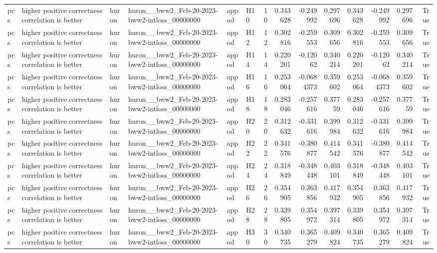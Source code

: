 \begin{longtable}{llllllrrrrrrrr}
pcs & higher positive correctness correlation is better & huron & huron\_\_bww2\_Feb-20-2023-bww2-intloss\_00000000 & appod & H10 & 10 & 0.343628 & -0.249992 & 0.297696 & 0.343628 & -0.249992 & 0.297696 & True \\
pcs & higher positive correctness correlation is better & huron & huron\_\_bww2\_Feb-20-2023-bww2-intloss\_00000000 & appod & H12 & 12 & 0.302816 & -0.259553 & 0.309656 & 0.302816 & -0.259553 & 0.309656 & True \\
pcs & higher positive correctness correlation is better & huron & huron\_\_bww2\_Feb-20-2023-bww2-intloss\_00000000 & appod & H14 & 14 & 0.220201 & -0.12062 & 0.340214 & 0.220201 & -0.12062 & 0.340214 & True \\
pcs & higher positive correctness correlation is better & huron & huron\_\_bww2\_Feb-20-2023-bww2-intloss\_00000000 & appod & H16 & 16 & 0.253064 & -0.0684373 & 0.359602 & 0.253064 & -0.0684373 & 0.359602 & True \\
pcs & higher positive correctness correlation is better & huron & huron\_\_bww2\_Feb-20-2023-bww2-intloss\_00000000 & appod & H18 & 18 & 0.283046 & -0.257616 & 0.37759 & 0.283046 & -0.257616 & 0.37759 & True \\
pcs & higher positive correctness correlation is better & huron & huron\_\_bww2\_Feb-20-2023-bww2-intloss\_00000000 & appod & H20 & 20 & 0.312632 & -0.331616 & 0.399984 & 0.312632 & -0.331616 & 0.399984 & True \\
pcs & higher positive correctness correlation is better & huron & huron\_\_bww2\_Feb-20-2023-bww2-intloss\_00000000 & appod & H22 & 22 & 0.341576 & -0.380877 & 0.414542 & 0.341576 & -0.380877 & 0.414542 & True \\
pcs & higher positive correctness correlation is better & huron & huron\_\_bww2\_Feb-20-2023-bww2-intloss\_00000000 & appod & H24 & 24 & 0.318849 & -0.348448 & 0.403101 & 0.318849 & -0.348448 & 0.403101 & True \\
pcs & higher positive correctness correlation is better & huron & huron\_\_bww2\_Feb-20-2023-bww2-intloss\_00000000 & appod & H26 & 26 & 0.354905 & 0.363856 & 0.417932 & 0.354905 & 0.363856 & 0.417932 & True \\
pcs & higher positive correctness correlation is better & huron & huron\_\_bww2\_Feb-20-2023-bww2-intloss\_00000000 & appod & H28 & 28 & 0.339805 & 0.354972 & 0.397314 & 0.339805 & 0.354972 & 0.397314 & True \\
pcs & higher positive correctness correlation is better & huron & huron\_\_bww2\_Feb-20-2023-bww2-intloss\_00000000 & appod & H30 & 30 & 0.340735 & 0.365279 & 0.409824 & 0.340735 & 0.365279 & 0.409824 & True \\

\end{longtable}
